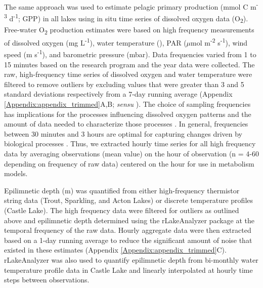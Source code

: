 \documentclass[12pt, oneside]{article}
\begin{document}
The same approach was used to estimate pelagic primary production (mmol C m\textsuperscript{-3} d\textsuperscript{-1}; GPP) in all lakes using in situ time series of dissolved oxygen data (O\textsubscript{2}). Free-water O\textsubscript{2} production estimates were based on high frequency measurements of dissolved oxygen (mg L\textsuperscript{-1}), water temperature (\textcelsius{}), PAR ($\mu$mol m\textsuperscript{-2} s\textsuperscript{-1}), wind speed (m s\textsuperscript{-1}), and barometric pressure (mbar). Data frequencies varied from 1 to 15 minutes based on the research program and the year data were collected. The raw, high-frequency time series of dissolved oxygen and water temperature were filtered to remove outliers by excluding values that were greater than 3 and 5 standard deviations respectively from a 7-day running average (Appendix \ref{Appendix:appendix_trimmed}A,B; \emph{sensu} \citealt{phillips_timevarying_2020}). The choice of sampling frequencies has implications for the processes influencing dissolved oxygen patterns and the amount of data needed to characterize those processes \citep{staehr_lake_2010}. In general, frequencies between 30 minutes and 3 hours are optimal for capturing changes driven by biological processes \citep{staehr_lake_2010}. Thus, we extracted hourly time series for all high frequency data by averaging observations (mean value) on the hour of observation (n = 4-60 depending on frequency of raw data) centered on the hour \citep{phillips_timevarying_2020} for use in metabolism models.

Epilimnetic depth (m) was quantified from either high-frequency thermistor string data (Trout, Sparkling, and Acton Lakes) or discrete temperature profiles (Castle Lake). The high frequency data were filtered for outliers as outlined above and epilimnetic depth determined using the rLakeAnalyzer package \citep{read_derivation_2011, winslow_rlakeanalyzer_2019} at the temporal frequency of the raw data. Hourly aggregate data were then extracted based on a 1-day running average to reduce the significant amount of noise that existed in these estimates (Appendix \ref{Appendix:appendix_trimmed}C). rLakeAnalyzer was also used to quantify epilimnetic depth from bi-monthly water temperature profile data in Castle Lake and linearly interpolated at hourly time steps between observations.
\end{document}
